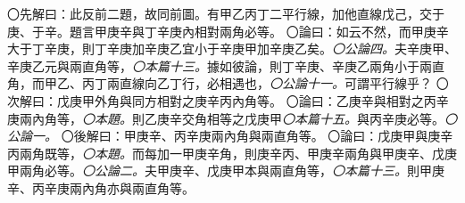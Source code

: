 \documentclass[12pt,b5paper,landscape]{article}
\newcommand{\ccom}[1]{{\footnotesize \emph{〇#1}}}
\newcommand{\bcom}[1]{〇#1}
\begin{document}
\begin{multicols}{2}
\begin{center}
\end{center}
\bcom{先解曰：此反前二題，故同前圖。有甲乙丙丁二平行線，加他直線戊己，交于庚、于辛。題言甲庚辛與丁辛庚內相對兩角必等。}
\bcom{論曰：如云不然，而甲庚辛大于丁辛庚，則丁辛庚加辛庚乙宜小于辛庚甲加辛庚乙矣。\ccom{公論四。}夫辛庚甲、辛庚乙元與兩直角等，\ccom{本篇十三。}據如彼論，則丁辛庚、辛庚乙兩角小于兩直角，而甲乙、丙丁兩直線向乙丁行，必相遇也，\ccom{公論十一。}可謂平行線乎？}
\bcom{次解曰：戊庚甲外角與同方相對之庚辛丙內角等。}
\bcom{論曰：乙庚辛與相對之丙辛庚兩內角等，\ccom{本題。}則乙庚辛交角相等之戊庚甲\ccom{本篇十五。}與丙辛庚必等。\ccom{公論一。}}
\bcom{後解曰：甲庚辛、丙辛庚兩內角與兩直角等。}
\bcom{論曰：戊庚甲與庚辛丙兩角既等，\ccom{本題。}而每加一甲庚辛角，則庚辛丙、甲庚辛兩角與甲庚辛、戊庚甲兩角必等。\ccom{公論二。}夫甲庚辛、戊庚甲本與兩直角等，\ccom{本篇十三。}則甲庚辛、丙辛庚兩內角亦與兩直角等。}


\end{multicols}
\end{document}
